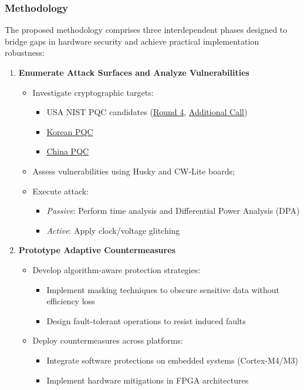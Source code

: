 \documentclass[11pt, a4paper]{article}
\begin{document}
\subsubsection*{Methodology}

The proposed methodology comprises three 
interdependent phases designed to bridge gaps 
in hardware security and achieve practical implementation robustness:


\begin{enumerate}
\item \textbf{Enumerate Attack Surfaces and Analyze Vulnerabilities} 
\begin{itemize}[leftmargin=2em] 
\item Investigate cryptographic targets: 
\begin{itemize} \item USA NIST PQC candidates 
(\href{https://csrc.nist.gov/projects/post-quantum-cryptography/round-4-submissions}{Round 4}, 
\href{https://csrc.nist.gov/projects/pqc-dig-sig/round-2-additional-signatures}{Additional Call}) 
\item \href{https://www.kpqc.or.kr/competition.html}{Korean PQC} 
\item \href{https://niccs.org.cn/en/notice/}{China PQC} 
\end{itemize} 
\item Assess vulnerabilities using Husky and CW-Lite boards; 
\item Execute attack: 
    \begin{itemize} 
    \item \textit{Passive}: Perform time analysis and Differential Power Analysis (DPA) 
    \item \textit{Active}: Apply clock/voltage glitching 
    \end{itemize} 
\end{itemize}

\item \textbf{Prototype Adaptive Countermeasures}
\begin{itemize}[leftmargin=2em]
    \item Develop algorithm-aware protection strategies:
    \begin{itemize}
        \item Implement masking techniques to obscure sensitive data without efficiency loss
        \item Design fault-tolerant operations to resist induced faults
    \end{itemize}
    \item Deploy countermeasures across platforms:
    \begin{itemize}
        \item Integrate software protections on embedded systems (Cortex-M4/M3)
        \item Implement hardware mitigations in FPGA architectures
    \end{itemize}
\end{itemize}


\end{enumerate}
\end{document}
